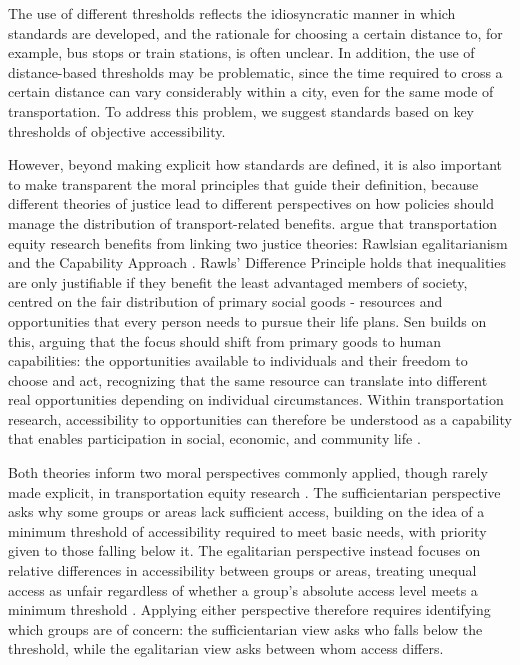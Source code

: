 \documentclass[preprint, 3p,
authoryear]{elsarticle} %
\begin{document}
The use of different thresholds reflects the idiosyncratic manner in
which standards are developed, and the rationale for choosing a certain
distance to, for example, bus stops or train stations, is often unclear.
In addition, the use of distance-based thresholds may be problematic,
since the time required to cross a certain distance can vary
considerably within a city, even for the same mode of transportation. To
address this problem, we suggest standards based on key thresholds of
objective accessibility.

However, beyond making explicit how standards are defined, it is also
important to make transparent the moral principles that guide their
definition, because different theories of justice lead to different
perspectives on how policies should manage the distribution of
transport-related benefits. \citet{pereira2021} argue that
transportation equity research benefits from linking two justice
theories: Rawlsian egalitarianism \citep{rawls1999} and the Capability
Approach \citep{sen1979, sen1999, sen2005, sen2009}. Rawls' Difference
Principle holds that inequalities are only justifiable if they benefit
the least advantaged members of society, centred on the fair
distribution of primary social goods - resources and opportunities that
every person needs to pursue their life plans. Sen builds on this,
arguing that the focus should shift from primary goods to human
capabilities: the opportunities available to individuals and their
freedom to choose and act, recognizing that the same resource can
translate into different real opportunities depending on individual
circumstances. Within transportation research, accessibility to
opportunities can therefore be understood as a capability that enables
participation in social, economic, and community life
\citep{pereira2017, luz2022}.

Both theories inform two moral perspectives commonly applied, though
rarely made explicit, in transportation equity research
\citep{martens2016a, wee2011}. The sufficientarian perspective asks why
some groups or areas lack sufficient access, building on the idea of a
minimum threshold of accessibility required to meet basic needs, with
priority given to those falling below it. The egalitarian perspective
instead focuses on relative differences in accessibility between groups
or areas, treating unequal access as unfair regardless of whether a
group's absolute access level meets a minimum threshold
\citep{pereira2021}. Applying either perspective therefore requires
identifying which groups are of concern: the sufficientarian view asks
who falls below the threshold, while the egalitarian view asks between
whom access differs.
\end{document}
